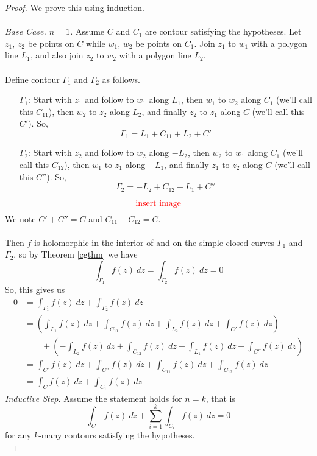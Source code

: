 \begin{proof}
We prove this using induction.\\
\\
\emph{Base Case. $n=1$.} Assume $C$ and $C_1$ are contour satisfying the hypotheses. Let $z_1,\,z_2$ be points on $C$ while $w_1,\,w_2$ be points on $C_1$. Join $z_1$ to $w_1$ with a polygon line $L_1$, and also join $z_2$ to $w_2$ with a polygon line $L_2$.\\
\\
Define contour $\Gamma_1$ and $\Gamma_2$ as follows.
\begin{itemize}
\item[$\Gamma_1$:] Start with $z_1$ and follow to $w_1$ along $L_1$, then $w_1$ to $w_2$ along $C_1$ (we'll call this $C_{11}$), then $w_2$ to $z_2$ along $L_2$, and finally $z_2$ to $z_1$ along $C$ (we'll call this $C'$). So, 
\[\Gamma_1 = L_1 + C_{11} + L_2 + C'\]
\item[$\Gamma_2$:] Start with $z_2$ and follow to $w_2$ along $-L_2$, then $w_2$ to $w_1$ along $C_1$ (we'll call this $C_{12}$), then $w_1$ to $z_1$ along $-L_1$, and finally $z_1$ to $z_2$ along $C$ (we'll call this $C''$). So, 
\[\Gamma_2 = -L_2 + C_{12} - L_1 + C''\]
\end{itemize}
\[\text{\color{red} insert image}\]
\vfill
We note $C' + C'' = C$ and $C_{11} + C_{12} = C$.\\
\\
Then $f$ is holomorphic in the interior of and on the simple closed curves $\Gamma_1$ and $\Gamma_2$, so by Theorem \ref{cgthm} we have
\[\int_{\Gamma_1}f(z)\ dz = \int_{\Gamma_2}f(z)\ dz = 0\]
So, this gives us
\begin{align*}
0 &= \int_{\Gamma_1}f(z)\ dz + \int_{\Gamma_2}f(z)\ dz\\[1em]
 &= \left(\int_{L_1}f(z)\ dz + \int_{C_{11}}f(z)\ dz + \int_{L_2}f(z)\ dz + \int_{C'}f(z)\ dz\right)\\[1em]
 &\qquad + \left(-\int_{L_2}f(z)\ dz + \int_{C_{12}}f(z)\ dz - \int_{L_1}f(z)\ dz + \int_{C''}f(z)\ dz\right)\\[1em]
 &= \int_{C'}f(z)\ dz + \int_{C''}f(z)\ dz + \int_{C_{11}}f(z)\ dz + \int_{C_{12}}f(z)\ dz\\[1em]
 &= \int_{C}f(z)\ dz + \int_{C_1}f(z)\ dz
\end{align*}
\emph{Inductive Step.} Assume the statement holds for $n = k$, that is
\[\int_C\,f(z)\ dz + \sum_{i=1}^k\int_{C_i}f(z)\ dz = 0\]
for any $k$-many contours satisfying the hypotheses.\\

\end{proof}
